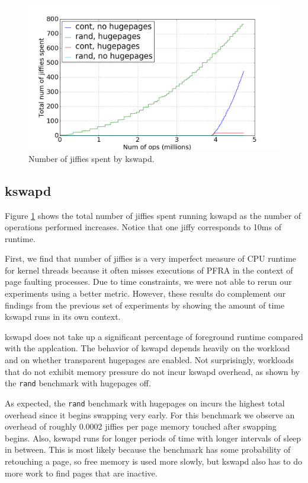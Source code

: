\documentclass[twocolumn,11pt]{article}
\begin{document}

\begin{figure}[t]
    \includegraphics[width=\columnwidth]{figures/kswapd_jiffies}
    \caption{Number of jiffies spent by kswapd.\label{fig:kswapd_jiffies}}
\end{figure}

\subsection{kswapd}

Figure \ref{fig:kswapd_jiffies} shows the total number of jiffies spent running kswapd as the
number of operations performed increases. Notice that one jiffy corresponds to
10ms of runtime.

First, we find that number of jiffies is a very imperfect measure of CPU runtime
for kernel threads because it often misses executions of PFRA in the context of
page faulting processes. Due to time constraints, we were not able to rerun our
experiments using a better metric. However, these results do complement our
findings from the previous set of experiments by showing the amount of time
kswapd runs in its own context.

kswapd does not take up a significant percentage of foreground runtime compared
with the applcation. The behavior of kswapd depends heavily on the workload and
on whether transparent hugepages are enabled. Not surprisingly, workloads that
do not exhibit memory pressure do not incur kswapd overhead, as shown by the
\texttt{rand} benchmark with hugepages off.

As expected, the \texttt{rand} benchmark with hugepages on incurs the highest
total overhead since it begins swapping very early. For this benchmark we
observe an overhead of roughly 0.0002 jiffies per page memory touched after
swapping begins. Also, kswapd runs for longer periods of time with longer
intervals of sleep in between. This is most likely because the benchmark has
some probability of retouching a page, so free memory is used more slowly, but
kswapd also has to do more work to find pages that are inactive.
\end{document}
